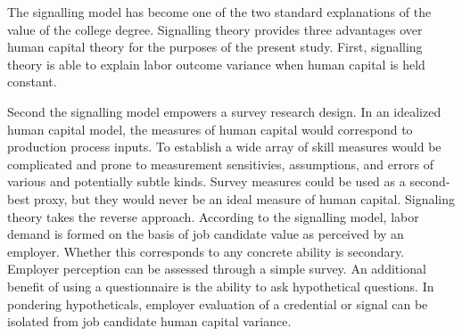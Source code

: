 \documentclass[review]{elsarticle}
\begin{document}



The signalling model has become one of the two standard explanations of the value of the college degree.
Signalling theory provides three advantages over human capital theory for the purposes of the present study.
First, signalling theory is able to explain labor outcome variance when human capital is held constant.

Second the signalling model empowers a survey research design.
In an idealized human capital model, the measures of human capital would correspond to production process inputs.
To establish a wide array of skill measures would be complicated and prone to measurement sensitivies, assumptions, and errors of various and potentially subtle kinds.
Survey measures could be used as a second-best proxy, but they would never be an ideal measure of human capital.
Signaling theory takes the reverse approach.
According to the signalling model, labor demand is formed on the basis of job candidate value as perceived by an employer.
Whether this corresponds to any concrete ability is secondary.
Employer perception can be assessed through a simple survey.
An additional benefit of using a questionnaire is the ability to ask hypothetical questions.
In pondering hypotheticals, employer evaluation of a credential or signal can be isolated from job candidate human capital variance.
\end{document}
